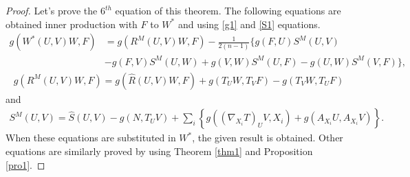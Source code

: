 \documentclass{birkjour}
\theoremstyle{definition}
\theoremstyle{remark}
\numberwithin{equation}{section}
\begin{document}
\begin{proof}
	Let's prove the $6^{th}$ equation of this theorem.
	The following equations are obtained inner production with $F$ to $W^*$ and using \eqref{g1} and \eqref{S1} equations.
	\begin{align*}
		g(W^* (U,V)W,F)&=g(R^M(U,V)W,F)- \frac{1}{2(n-1)} \bigg\{g(F,U)S^M(U,V)\\
		&-g(F,V)S^M(U,W) +g(V,W)S^M(U,F)-g(U,W)S^M(V,F) \bigg\}, \nonumber
	\end{align*}
	\begin{align*}
		g(R^M(U,V)W,F)=g(\hat{R}(U,V)W,F)+g(T_U W, T_V F)- g(T_V W, T_U F)
	\end{align*}
	and
	\begin{align*}
		S^M(U,V)= \hat{S}(U,V)- g(N, T_U V) +  \sum_{i}\left\{g((\nabla_{X_i}T)_U V, X_i)+g(A_{X_i}U, A_{X_i}V) \right\}.
	\end{align*}
	When these equations are substituted in $W^*$, the given result is obtained. Other equations are similarly proved by using Theorem \ref{thm1} and Proposition \ref{pro1}.
\end{proof}
\end{document}
